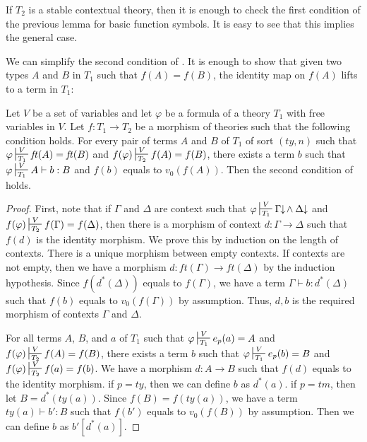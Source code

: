 \documentclass[reqno]{amsart}
\theoremstyle{definition}
\theoremstyle{remark}
\newcommand{\ft}{\mathit{ft}}
\newcommand{\ty}{\mathit{ty}}
\newcommand{\tm}{\mathit{tm}}
\numberwithin{figure}{section}
\begin{document}
\begin{remark}
If $T_2$ is a stable contextual theory, then it is enough to check the first condition of the previous lemma for basic function symbols.
It is easy to see that this implies the general case.
\end{remark}

We can simplify the second condition of .
It is enough to show that given two types $A$ and $B$ in $T_1$ such that $f(A) = f(B)$, the identity map on $f(A)$ lifts to a term in $T_1$:

\begin{lem}
Let $V$ be a set of variables and let $\varphi$ be a formula of a theory $T_1$ with free variables in $V$.
Let $f : T_1 \to T_2$ be a morphism of theories such that the following condition holds.
For every pair of terms $A$ and $B$ of $T_1$ of sort $(\ty,n)$ such that
$\varphi \sststile{T_1}{V} \ft(A) = \ft(B)$ and $f(\varphi) \sststile{T_2}{V} f(A) = f(B)$,
there exists a term $b$ such that $\varphi \sststile{T_1}{V} A \vdash b : B$ and $f(b)$ equals to $v_0(f(A))$.
Then the second condition of  holds.
\end{lem}
\begin{proof}
First, note that if $\Gamma$ and $\Delta$ are context such that $\varphi \sststile{T_1}{V} \Gamma\!\!\downarrow\!\land\:\Delta\!\!\downarrow$ and $f(\varphi) \sststile{T_2}{V} f(\Gamma) = f(\Delta)$,
then there is a morphism of context $d : \Gamma \to \Delta$ such that $f(d)$ is the identity morphism.
We prove this by induction on the length of contexts.
There is a unique morphism between empty contexts.
If contexts are not empty, then we have a morphism $d : \ft(\Gamma) \to \ft(\Delta)$ by the induction hypothesis.
Since $f(d^*(\Delta))$ equals to $f(\Gamma)$, we have a term $\Gamma \vdash b : d^*(\Delta)$ such that $f(b)$ equals to $v_0(f(\Gamma))$ by assumption.
Thus, $d,b$ is the required morphism of contexts $\Gamma$ and $\Delta$.

For all terms $A$, $B$, and $a$ of $T_1$ such that $\varphi \sststile{T_1}{V} e_p(a) = A$ and $f(\varphi) \sststile{T_2}{V} f(A) = f(B)$,
there exists a term $b$ such that $\varphi \sststile{T_1}{V} e_p(b) = B$ and $f(\varphi) \sststile{T_2}{V} f(a) = f(b)$.
We have a morphism $d : A \to B$ such that $f(d)$ equals to the identity morphism.
if $p = \ty$, then we can define $b$ as $d^*(a)$.
if $p = \tm$, then let $B = d^*(\ty(a))$.
Since $f(B) = f(\ty(a))$, we have a term $\ty(a) \vdash b' : B$ such that $f(b')$ equals to $v_0(f(B))$ by assumption.
Then we can define $b$ as $b'[d^*(a)]$.
\end{proof}
\end{document}
